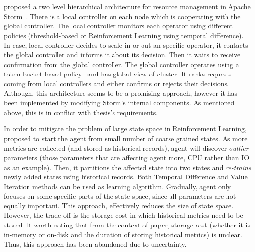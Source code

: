 \textcite{CARDELLINI2018171} proposed a two level hierarchical architecture for resource management in Apache Storm~\cite{Storm}. There is a local controller on each node which is cooperating with the global controller. The local controller monitors each operator using different policies (threshold-based or Reinforcement Learning using temporal difference). In case, local controller decides to scale in or out an specific operator, it contacts the global controller and informs it about its decision. Then it waits to receive confirmation from the global controller. The global controller operates using a token-bucket-based policy~\cite{Valeria:2018} and has global view of cluster. It ranks requests coming from local controllers and either confirms or rejects their decisions. Although, this architecture seems to be a promising approach, however it has been implemented by modifying Storm's internal components. As mentioned above, this is in conflict with thesis's requirements.

In order to mitigate the problem of large state space in Reinforcement Learning, \textcite{Lolos:2017} proposed to start the agent from small number of coarse grained states. As more metrics are collected (and stored as historical records), agent will discover \emph{outlier} parameters (those parameters that are affecting agent more, CPU rather than IO as an example). Then, it partitions the affected state into two states and \emph{re-trains} newly added states using historical records. Both Temporal Difference and Value Iteration methods can be used as learning algorithm. Gradually, agent only focuses on some specific parts of the state space, since all parameters are not equally important. This approach, effectively reduces the size of state space. However, the trade-off is the storage cost in which historical metrics need to be stored. It worth noting that from the context of paper, storage cost (whether it is in-memory or on-disk and the duration of storing historical metrics) is unclear. Thus, this approach has been abandoned due to uncertainty.

